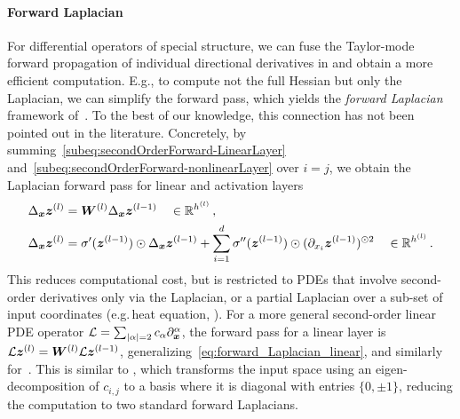 \paragraph{Forward Laplacian} For differential operators of special structure, we can fuse the Taylor-mode forward propagation of individual directional derivatives in  and obtain a more efficient computation.
E.g., to compute not the full Hessian but only the Laplacian, we can simplify the forward pass, which yields the \emph{forward Laplacian} framework of~\citet{li2023forward}.
To the best of our knowledge, this connection has not been pointed out in the literature.
Concretely, by summing~\eqref{subeq:secondOrderForward-LinearLayer} and~\eqref{subeq:secondOrderForward-nonlinearLayer} over $i=j$, we obtain the Laplacian forward pass for linear and activation layers
\begin{subequations}\label{eq:forward-laplacian-main}
  \begin{align}
    \label{eq:forward_Laplacian_linear}
    \Delta_{\bm{x}}{\bm{z}}^{(l)}
    &=
      {\bm{W}}^{(l)}\Delta_{\bm{x}}{\bm{z}}^{(l-1)}
      \quad \in {\mathbb{R}}^{h^{(l)}}\,,
    \\
    \label{eq:forward_Laplacian_nonlinear}
    \Delta_{\bm{x}}{\bm{z}}^{(l)}
    &=
      \sigma'({\bm{z}}^{(l-1)})\odot\Delta_{\bm{x}}{\bm{z}}^{(l-1)}
      +
      \sum_{i=1}^d \sigma''({\bm{z}}^{(l-1)})\odot (\partial_{x_i}{{\bm{z}}^{(l-1)}})^{\odot 2}
      \quad \in {\mathbb{R}}^{h^{(l)}}\,.
  \end{align}
\end{subequations}
This reduces computational cost, but is restricted to PDEs that involve second-order derivatives only via the Laplacian, or a partial Laplacian over a sub-set of input coordinates (e.g.\,heat equation, ).
For a more general second-order linear PDE operator $\mathcal L = \sum_{\lvert \alpha \rvert=2}c_\alpha \partial^\alpha_{\bm{x}}$, the forward pass for a linear layer is $\mathcal{L} {\bm{z}}^{(l)} = {\bm{W}}^{(l)}\mathcal{L} {\bm{z}}^{(l-1)}$, generalizing~\eqref{eq:forward_Laplacian_linear}, and similarly for~.
This is similar to \cite{li2024dof}, which transforms the input space using an eigen-decomposition of $c_{i,j}$ to a basis where it is diagonal with entries $\{0, \pm 1\}$, reducing the computation to two standard forward Laplacians.

